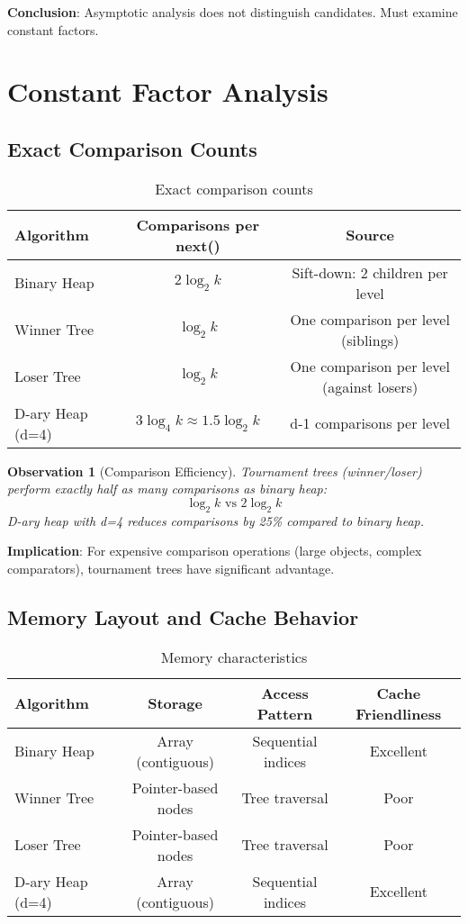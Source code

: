 \documentclass[11pt]{article}
\newtheorem{observation}{Observation}
\begin{document}
\textbf{Conclusion}: Asymptotic analysis does not distinguish candidates. Must examine constant factors.

\section{Constant Factor Analysis}

\subsection{Exact Comparison Counts}

\begin{table}[h]
\centering
\begin{tabular}{lcc}
\toprule
\textbf{Algorithm} & \textbf{Comparisons per next()} & \textbf{Source} \\
\midrule
Binary Heap & $2 \log_2 k$ & Sift-down: 2 children per level \\
Winner Tree & $\log_2 k$ & One comparison per level (siblings) \\
Loser Tree & $\log_2 k$ & One comparison per level (against losers) \\
D-ary Heap (d=4) & $3 \log_4 k \approx 1.5 \log_2 k$ & d-1 comparisons per level \\
\bottomrule
\end{tabular}
\caption{Exact comparison counts}
\end{table}

\begin{observation}[Comparison Efficiency]
Tournament trees (winner/loser) perform exactly half as many comparisons as binary heap:
\[
\log_2 k \text{ vs } 2\log_2 k
\]
D-ary heap with d=4 reduces comparisons by 25\% compared to binary heap.
\end{observation}

\textbf{Implication}: For expensive comparison operations (large objects, complex comparators), tournament trees have significant advantage.

\subsection{Memory Layout and Cache Behavior}

\begin{table}[h]
\centering
\begin{tabular}{lccc}
\toprule
\textbf{Algorithm} & \textbf{Storage} & \textbf{Access Pattern} & \textbf{Cache Friendliness} \\
\midrule
Binary Heap & Array (contiguous) & Sequential indices & Excellent \\
Winner Tree & Pointer-based nodes & Tree traversal & Poor \\
Loser Tree & Pointer-based nodes & Tree traversal & Poor \\
D-ary Heap (d=4) & Array (contiguous) & Sequential indices & Excellent \\
\bottomrule
\end{tabular}
\caption{Memory characteristics}
\end{table}
\end{document}
